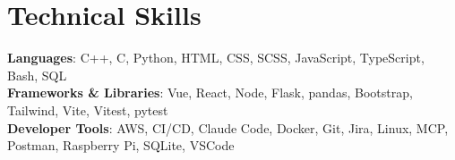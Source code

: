 \documentclass[letterpaper,11pt]{article}
\begin{document}
\section{Technical Skills}
 \begin{itemize}[leftmargin=0.1in, label={}]
    \small{\item{
     \textbf{Languages}{: C++, C, Python, HTML, CSS, SCSS, JavaScript, TypeScript, Bash, SQL} \\
     \textbf{Frameworks \& Libraries}{: Vue, React, Node, Flask, pandas, Bootstrap, Tailwind, Vite, Vitest, pytest} \\
     \textbf{Developer Tools}{: AWS, CI/CD, Claude Code, Docker, Git, Jira, Linux, MCP, Postman, Raspberry Pi, SQLite, VSCode}
    }}
 \end{itemize}

\end{document}
